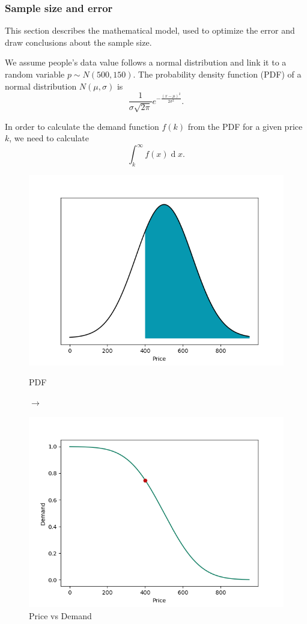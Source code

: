 \documentclass[11pt, a4paper]{article}
\theoremstyle{definition}
\begin{document}
			\subsubsection{Sample size and error}
			This section describes the mathematical model, used to optimize the error and draw conclusions about the sample size.\par
			We assume people's data value follows a normal distribution and link it to a random variable $p\sim N(500, 150)$. The probability density function (PDF) of a normal distribution $N(\mu, \sigma)$ is $$\frac{1}{\sigma\sqrt{2\pi}}e^{-\frac{(x-\mu)^{2}}{2\sigma^{2}}}.$$\par\noindent
			In order to calculate the demand function $f(k)$ from the PDF for a given price $k$, we need to calculate
			$$\int_{k}^{\infty}f(x)\operatorname{d} x.$$
			\begin{figure}[H]
				\begin{minipage}{0.48\textwidth}
					\centering
					\includegraphics[width=\linewidth]{ND_integral}
					\caption{PDF}\label{Fig:Data1}
				\end{minipage}$\longrightarrow$
				\begin{minipage}{0.48\textwidth}
					\centering
					\includegraphics[width=\linewidth]{Sample_point}
					\caption{Price vs Demand}\label{Fig:Data2}
				\end{minipage}
			\end{figure}\par\noindent
\end{document}
